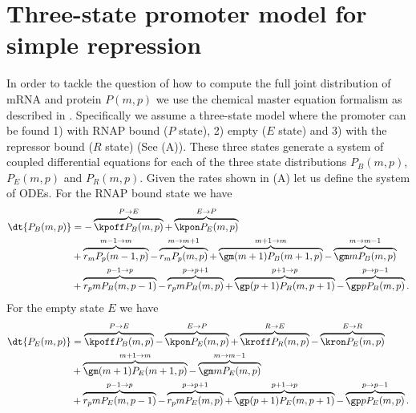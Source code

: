 \section{Three-state promoter model for simple repression}\label{supp_model}

In order to tackle the question of how to compute the full joint distribution of
mRNA and protein $P(m, p)$ we use the chemical master equation formalism as
described in . Specifically we assume a three-state model
where the promoter can be found 1) with RNAP bound ($P$ state), 2) empty ($E$
state) and 3) with the repressor bound ($R$ state) (See
(A)). These three states generate a system of coupled
differential equations for each of the three state distributions $P_B(m, p)$,
$P_E(m, p)$ and $P_R(m, p)$. Given the rates shown in
(A) let us define the system of ODEs. For the RNAP
bound state we have
\begin{equation}
  \begin{aligned}
    \dt{P_B(m, p)} &=
    - \overbrace{\kpoff P_B(m, p)}^{P \rightarrow E} %
    + \overbrace{\kpon P_E(m, p)}^{E \rightarrow P}\\ %
    &+ \overbrace{r_m P_p(m-1, p)}^{m-1 \rightarrow m} %
    - \overbrace{r_m P_p(m, p)}^{m \rightarrow m+1}%
    + \overbrace{\gm (m + 1) P_B(m+1 , p)}^{m+1 \rightarrow m} %
    - \overbrace{\gm m P_B(m , p)}^{m \rightarrow m-1}\\ %
    &+ \overbrace{r_p m P_B(m, p - 1)}^{p-1 \rightarrow p} %
    - \overbrace{r_p m P_B(m, p)}^{p \rightarrow p+1} %
    + \overbrace{\gp (p + 1) P_B(m, p + 1)}^{p + 1 \rightarrow p} %
    - \overbrace{\gp p P_B(m, p)}^{p \rightarrow p-1}. %
  \end{aligned}
\end{equation}
For the empty state $E$ we have
\begin{equation}
  \begin{aligned}
    \dt{P_E(m, p)} &=
    \overbrace{\kpoff P_B(m, p)}^{P \rightarrow E} %
    - \overbrace{\kpon P_E(m, p)}^{E \rightarrow P} %
    + \overbrace{\kroff P_R(m, p)}^{R \rightarrow E} %
    - \overbrace{\kron P_E(m, p)}^{E \rightarrow R}\\ %
    &+ \overbrace{\gm (m + 1) P_E(m+1 , p)}^{m+1 \rightarrow m} %
    - \overbrace{\gm m P_E(m , p)}^{m \rightarrow m-1}\\ %
    &+ \overbrace{r_p m P_E(m, p - 1)}^{p-1 \rightarrow p} %
    - \overbrace{r_p m P_E(m, p)}^{p \rightarrow p+1} %
    + \overbrace{\gp (p + 1) P_E(m, p + 1)}^{p + 1 \rightarrow p} %
    - \overbrace{\gp p P_E(m, p)}^{p \rightarrow p-1}. %
  \end{aligned}
\end{equation}
